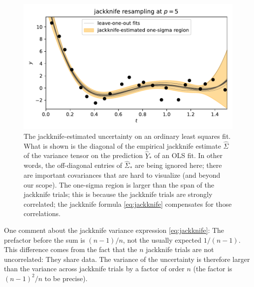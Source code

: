 \documentclass[12pt,letterpaper]{article}
\newlength{\figurewidth}
\begin{document}
\begin{figure}[t]
    \begin{mdframed}
    \includegraphics[width=\figurewidth]{paper/uncertainty.pdf}
    \caption{The jackknife-estimated uncertainty on an ordinary least squares fit. What is shown is the diagonal of the empirical jackknife estimate $\hat{\Sigma}$ of the variance tensor on the prediction $\hat{Y}_\ast$ of an OLS fit. In other words, the off-diagonal entries of $\hat{\Sigma}_\ast$ are being ignored here; there are important covariances that are hard to visualize (and beyond our scope). The one-sigma region is larger than the span of the jackknife trials; this is because the jackknife trials are strongly correlated; the jackknife formula \eqref{eq:jackknife} compensates for those correlations.}
    \label{fig:uncertainty}
    \end{mdframed}
\end{figure}

One comment about the jackknife variance expression \eqref{eq:jackknife}: The prefactor before the sum is $(n-1)/n$, not the usually expected $1/(n-1)$. This difference comes from the fact that the $n$ jackknife trials are not uncorrelated: They share data. The variance of the uncertainty is therefore larger than the variance across jackknife trials by a factor of order $n$ (the factor is $(n-1)^2/n$ to be precise).
\end{document}
